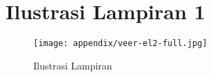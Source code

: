 \chapter{Ilustrasi Lampiran 1}

\begin{figure}[h]
	\centering
	\begin{sideways}
		\texttt{[image: appendix/veer-el2-full.jpg]}
	\end{sideways}
	\caption{Ilustrasi Lampiran}
	\label{appref1}
\end{figure}

